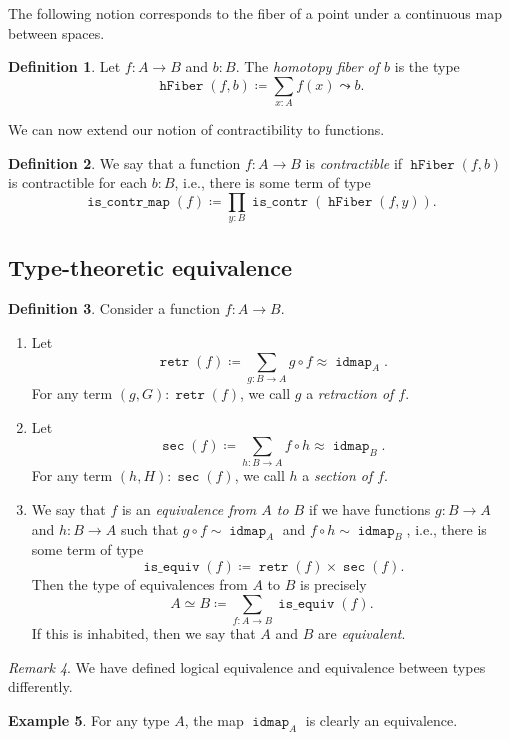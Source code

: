 \documentclass[10pt,letterpaper,cm]{nupset}
\theoremstyle{definition}
\newtheorem{definition}{Definition}[subsection]
\newtheorem{exmp}[definition]{Example}
\theoremstyle{theorem}
\theoremstyle{remark}
\newtheorem{remark}[definition]{Remark}
\newcommand{\0}{\mathbf{0}}
\newcommand{\1}{\mathbf{1}}
\newcommand{\2}{\mathbf{2}}
\DeclareMathOperator{\retr}{\mathtt{retr}}
\DeclareMathOperator{\sect}{\mathtt{sec}}
\DeclareMathOperator{\idmap}{\mathtt{idmap}}
\DeclareMathOperator{\isequiv}{\mathtt{is\_equiv}}
\DeclareMathOperator{\hfiber}{\mathtt{hFiber}}
\DeclareMathOperator{\iscont}{\mathtt{is\_contr}}
\DeclareMathOperator{\iscontmap}{\mathtt{is\_contr\_map}}
\newcommand{\be}{\begin{enumerate}}
\newcommand{\ee}{\end{enumerate}}
\begin{document}
The following notion corresponds to the fiber of a point under a continuous map between spaces.

\begin{definition} Let $f: A \to B$ and $b: B$.
 The \textit{homotopy fiber of $b$} is the type $$\hfiber(f,b) \coloneqq \sum_{x:A} f(x) \leadsto b .$$
\end{definition}

We can now extend our notion of contractibility to functions. 

\begin{definition}
We say that  a function $f: A \to B$ is \textit{contractible} if $\hfiber(f,b)$ is contractible for each $b: B$, i.e., there is some term of type $$\iscontmap(f) \coloneqq \prod_{y: B} \iscont(\hfiber(f,y)).$$
\end{definition}

\subsection{Type-theoretic equivalence}


\begin{definition} Consider a function $f: A \to B$.
\be
\item Let $$\retr(f) \coloneqq \sum_{g: B \to A} g \circ f \approx \idmap_A    .$$  For any term $\left(g, G\right) : \retr(f)$, we call $g$ a \textit{retraction of $f$}.
\item Let $$\sect(f) \coloneqq \sum_{h: B \to A} f \circ h \approx \idmap_B    .$$ For any term $\left(h, H\right) : \sect(f)$, we call $h$ a \textit{section of $f$}.
\item We say that $f$ is an \textit{equivalence from $A$ to $B$} if we have functions $g : B \to A$ and $h: B\to A$ such that $g \circ f \sim \idmap_A$ and $f \circ h \sim \idmap_B$, i.e., there is some term of type $$ \isequiv(f) \coloneqq \retr(f) \times \sect(f).  $$
Then the type of equivalences from $A$ to $B$ is precisely $$A \simeq B \coloneqq  \sum_{f:A \to B}\isequiv(f).$$ If this is inhabited, then we say that $A$ and $B$ are \textit{equivalent}. 
\ee
\end{definition}

\begin{remark}
We have defined logical equivalence and equivalence between types differently.
\end{remark}

\begin{exmp}\label{idequiv}
For any type $A$, the map $\idmap_A$ is clearly an equivalence.
\end{exmp}
\end{document}
